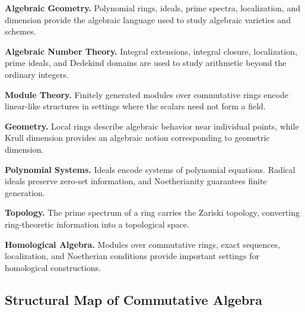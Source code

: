 \begin{applicationbox}
\textbf{Algebraic Geometry.}
Polynomial rings, ideals, prime spectra, localization, and dimension provide
the algebraic language used to study algebraic varieties and schemes.

\medskip

\textbf{Algebraic Number Theory.}
Integral extensions, integral closure, localization, prime ideals, and
Dedekind domains are used to study arithmetic beyond the ordinary integers.

\medskip

\textbf{Module Theory.}
Finitely generated modules over commutative rings encode linear-like
structures in settings where the scalars need not form a field.

\medskip

\textbf{Geometry.}
Local rings describe algebraic behavior near individual points, while Krull
dimension provides an algebraic notion corresponding to geometric dimension.

\medskip

\textbf{Polynomial Systems.}
Ideals encode systems of polynomial equations. Radical ideals preserve
zero-set information, and Noetherianity guarantees finite generation.

\medskip

\textbf{Topology.}
The prime spectrum of a ring carries the Zariski topology, converting
ring-theoretic information into a topological space.

\medskip

\textbf{Homological Algebra.}
Modules over commutative rings, exact sequences, localization, and
Noetherian conditions provide important settings for homological
constructions.
\end{applicationbox}

\subsection{Structural Map of Commutative Algebra}
\label{subsec:commutative-algebra-map}

